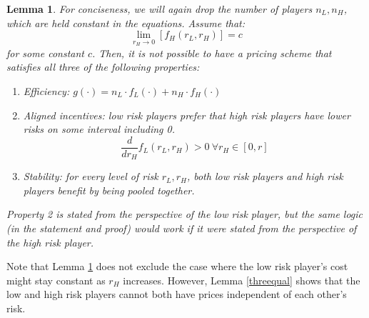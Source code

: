\documentclass[sigconf]{acmart}
\newtheorem{lemma}{Lemma}
\newcommand{\br}[1]{\left[ #1 \right]}
\newcommand{\nL}[0]{\ensuremath{n_L}}
\newcommand{\nH}[0]{\ensuremath{n_H}}
\newcommand{\rL}[0]{\ensuremath{r_L}}
\newcommand{\rH}[0]{\ensuremath{r_H}}
\newcommand{\cost}[0]{\ensuremath{g}}
\newcommand{\priceL}[0]{\ensuremath{f_L}}
\newcommand{\priceH}[0]{\ensuremath{f_H}}
\newcommand{\cd}[0]{\cdot}
\begin{document}
\begin{lemma}\label{aligned}
For conciseness, we will again drop the number of players $\nL, \nH$, which are held constant in the equations. Assume that:  
$$\lim_{\rH\rightarrow 0}\br{\priceH(\rL, \rH)} = c$$
for some constant $c$. Then, it is not possible to have a pricing scheme that satisfies all three of the following properties: 
\begin{enumerate}
    \item Efficiency: $\cost(\cd )=\nL \cd\priceL(\cd ) + \nH \cd \priceH(\cd )$
    \item Aligned incentives: low risk players prefer that high risk players have lower risks on some interval including 0. 
    $$\frac{d}{d\rH}\priceL(\rL, \rH) >0 \ \forall \rH \in [0, r]$$
    \item Stability: for every level of risk $\rL, \rH$, both low risk players and high risk players benefit by being pooled together. 
\end{enumerate}
Property 2 is stated from the perspective of the low risk player, but the same logic (in the statement and proof) would work if it were stated from the perspective of the high risk player. 
\end{lemma}
Note that Lemma \ref{aligned} does not exclude the case where the low risk player's cost might stay constant as $\rH$ increases. However, Lemma \ref{threequal} shows that the low and high risk players cannot both have prices independent of each other's risk. 
\end{document}
